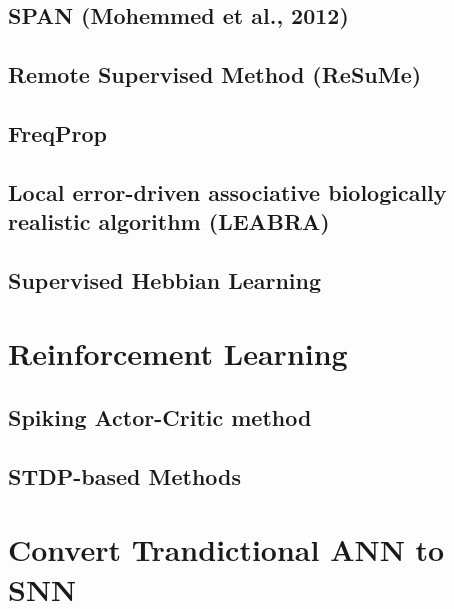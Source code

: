 







\subsection{SPAN (Mohemmed et al., 2012)}

\subsection{Remote Supervised Method (ReSuMe)}
\subsection{FreqProp}
\subsection{Local error-driven associative biologically realistic algorithm (LEABRA)}
\subsection{Supervised Hebbian Learning}

\section{Reinforcement Learning}
\subsection{Spiking Actor-Critic method}
\subsection{STDP-based Methods}

\section{Convert Trandictional ANN to SNN}